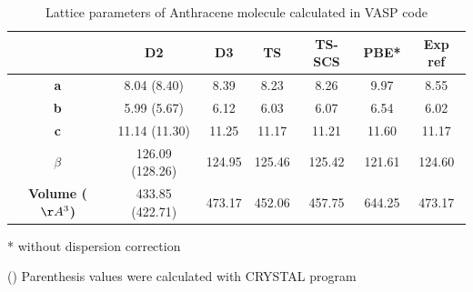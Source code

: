  
 	\begin{table}[htb]
 		\caption{Lattice parameters of Anthracene molecule calculated in VASP code} \label{table-Anthrasol}
 		\begin{center}
 			\begin{threeparttable}
 			\begin{tabular}{c c c c c c c}
 				\toprule
 				& \textbf{D2} & \textbf{D3} & \textbf{TS} & \textbf{TS-SCS} & \textbf{PBE*} & \textbf{Exp} ref\cite{brock1990temperature} \\
 				\midrule
 				\textbf{a} &8.04 (8.40) & 8.39 &8.23 & 8.26 & 9.97 &8.55 \\
 				\textbf{b}& 5.99 (5.67) & 6.12 & 6.03 & 6.07 & 6.54 & 6.02 \\
 				\textbf{c}& 11.14 (11.30) & 11.25 & 11.17 & 11.21 & 11.60 & 11.17 \\
 				\textbf{$\beta$} & 126.09 (128.26) & 124.95 & 125.46 & 125.42 & 121.61 & 124.60\\
 				\textbf{Volume ($\AA^{3}$)} & 433.85 (422.71) & 473.17 & 452.06 & 457.75 & 644.25 & 473.17\\
 				\bottomrule
 			\end{tabular}
 			
 			\begin{tablenotes}
 				\item[*] without dispersion correction
 				\item[()] Parenthesis values were calculated with CRYSTAL program
 			\end{tablenotes}
 		\end{threeparttable}
 		\end{center}
 	\end{table}
 

